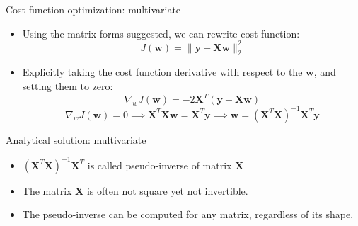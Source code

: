 \documentclass[serif, aspectratio=169]{beamer}
\begin{document}
\begin{frame}{Cost function optimization: multivariate}
    
    \begin{itemize}
        \item Using the matrix forms suggested, we can rewrite cost function:
        \[
        J(\mathbf{w}) = \| \mathbf{y} - \mathbf{Xw} \|_2^2
        \]
        \item Explicitly taking the cost function derivative with respect to the \( \mathbf{w} \), and setting them to zero:
        \[
        \nabla_w J(\mathbf{w}) = -2 \mathbf{X}^T \left( \mathbf{y} - \mathbf{Xw} \right)
        \]
        \[
        \nabla_w J(\mathbf{w}) = 0 \implies \mathbf{X}^T \mathbf{Xw} = \mathbf{X}^T \mathbf{y} \implies \mathbf{w} = \left( \mathbf{X}^T \mathbf{X} \right)^{-1} \mathbf{X}^T \mathbf{y}
        \]
    \end{itemize}


\end{frame}

\begin{frame}{Analytical solution: multivariate}
    \begin{itemize}
        \item \( \left(\mathbf{X}^T \mathbf{X} \right)^{-1} \mathbf{X}^T \) is called pseudo-inverse of matrix \( \mathbf{X} \)
        \item The matrix \( \mathbf{X} \) is often not square yet not invertible. \item The pseudo-inverse can be computed for any matrix, regardless of its shape.
    \end{itemize}
\end{frame}
\end{document}
